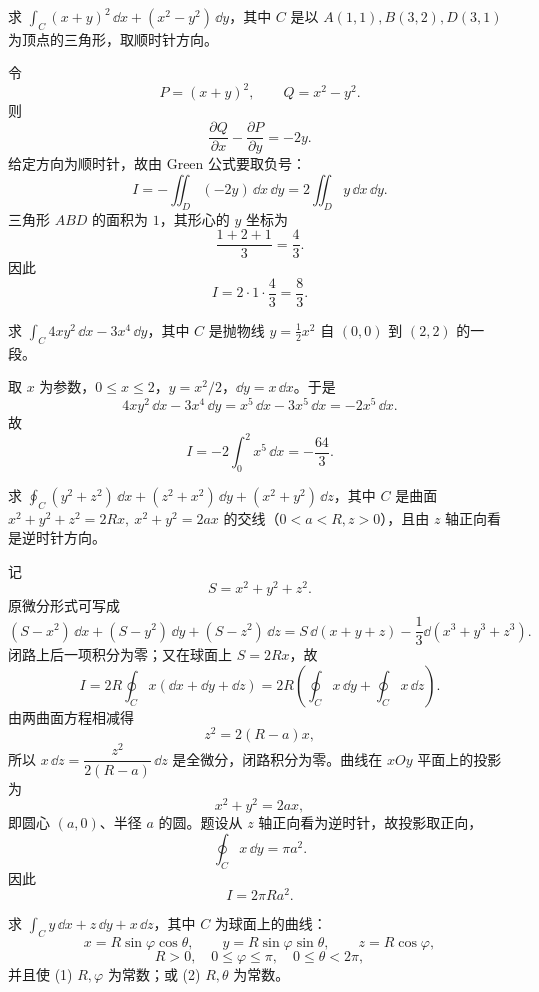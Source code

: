 \begin{xexercise}[3]
求 $\displaystyle\int_C(x+y)^2\,\dd x+(x^2-y^2)\,\dd y$，其中 $C$ 是以 $A(1,1),B(3,2),D(3,1)$ 为顶点的三角形，取顺时针方向。
\end{xexercise}
\begin{xsolution}
令
\[
  P=(x+y)^2,\qquad Q=x^2-y^2.
\]
则
\[
  \frac{\partial Q}{\partial x}-\frac{\partial P}{\partial y}
  =-2y.
\]
给定方向为顺时针，故由 Green 公式要取负号：
\[
  I=-\iint_D(-2y)\,\dd x\,\dd y
   =2\iint_Dy\,\dd x\,\dd y.
\]
三角形 $ABD$ 的面积为 $1$，其形心的 $y$ 坐标为
\[
  \frac{1+2+1}{3}=\frac43.
\]
因此
\[
  I=2\cdot1\cdot\frac43=\frac83.
\]
\end{xsolution}
\begin{xexercise}[4]
求 $\displaystyle\int_C4xy^2\,\dd x-3x^4\,\dd y$，其中 $C$ 是抛物线 $y=\frac12x^2$ 自 $(0,0)$ 到 $(2,2)$ 的一段。
\end{xexercise}
\begin{xsolution}
取 $x$ 为参数，$0\le x\le2$，$y=x^2/2$，$\dd y=x\,\dd x$。于是
\[
  4xy^2\,\dd x-3x^4\,\dd y
  =x^5\,\dd x-3x^5\,\dd x=-2x^5\,\dd x.
\]
故
\[
  I=-2\int_0^2x^5\,\dd x=-\frac{64}{3}.
\]
\end{xsolution}
\begin{xexercise}[5]
求 $\displaystyle\oint_C(y^2+z^2)\,\dd x+(z^2+x^2)\,\dd y+(x^2+y^2)\,\dd z$，其中 $C$ 是曲面 $x^2+y^2+z^2=2Rx,\ x^2+y^2=2ax$ 的交线（$0<a<R,z>0$），且由 $z$ 轴正向看是逆时针方向。
\end{xexercise}
\begin{xsolution}
记
\[
  S=x^2+y^2+z^2.
\]
原微分形式可写成
\[
  (S-x^2)\,\dd x+(S-y^2)\,\dd y+(S-z^2)\,\dd z
  =S\,\dd(x+y+z)-\frac13\dd(x^3+y^3+z^3).
\]
闭路上后一项积分为零；又在球面上 $S=2Rx$，故
\[
  I=2R\oint_Cx(\dd x+\dd y+\dd z)
   =2R\left(\oint_Cx\,\dd y+\oint_Cx\,\dd z\right).
\]
由两曲面方程相减得
\[
  z^2=2(R-a)x,
\]
所以 $x\,\dd z=\dfrac{z^2}{2(R-a)}\,\dd z$ 是全微分，闭路积分为零。曲线在 $xOy$ 平面上的投影为
\[
  x^2+y^2=2ax,
\]
即圆心 $(a,0)$、半径 $a$ 的圆。题设从 $z$ 轴正向看为逆时针，故投影取正向，
\[
  \oint_Cx\,\dd y=\pi a^2.
\]
因此
\[
  I=2\pi Ra^2.
\]
\end{xsolution}
\begin{xexercise}[6]
求 $\displaystyle\int_C y\,\dd x+z\,\dd y+x\,\dd z$，其中 $C$ 为球面上的曲线：
\[
  x=R\sin\varphi\cos\theta,\qquad y=R\sin\varphi\sin\theta,\qquad z=R\cos\varphi,
\]
\[
  R>0,\quad0\le\varphi\le\pi,\quad0\le\theta<2\pi,
\]
并且使 (1) $R,\varphi$ 为常数；或 (2) $R,\theta$ 为常数。
\end{xexercise}
